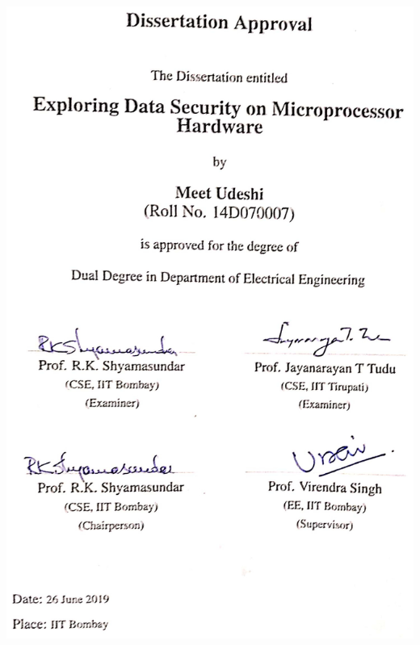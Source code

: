 \documentclass[twoside]{iitbreport}
\begin{document}

%

\thispagestyle{empty}
\includegraphics[width=\textwidth]{approval.jpg}
\end{document}
